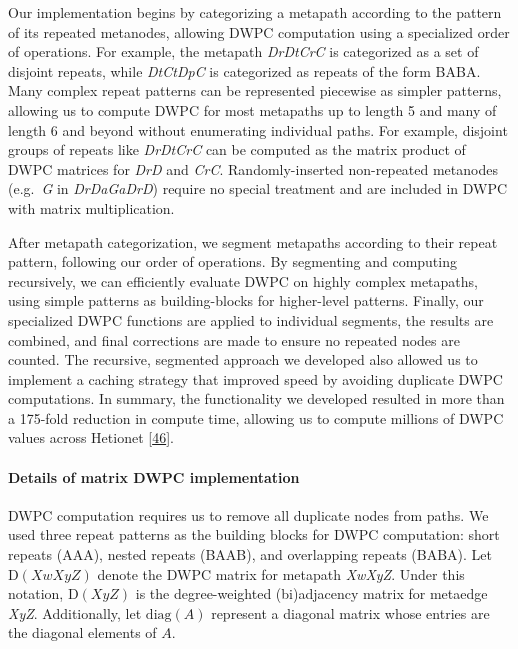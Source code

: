 Our implementation begins by categorizing a metapath according to the pattern of its repeated metanodes, allowing DWPC computation using a specialized order of operations.
For example, the metapath \emph{DrDtCrC} is categorized as a set of disjoint repeats, while \emph{DtCtDpC} is categorized as repeats of the form BABA.
Many complex repeat patterns can be represented piecewise as simpler patterns, allowing us to compute DWPC for most metapaths up to length 5 and many of length 6 and beyond without enumerating individual paths.
For example, disjoint groups of repeats like \emph{DrDtCrC} can be computed as the matrix product of DWPC matrices for \emph{DrD} and \emph{CrC}.
Randomly-inserted non-repeated metanodes (e.g.~\emph{G} in \emph{DrDaGaDrD}) require no special treatment and are included in DWPC with matrix multiplication.

After metapath categorization, we segment metapaths according to their repeat pattern, following our order of operations.
By segmenting and computing recursively, we can efficiently evaluate DWPC on highly complex metapaths, using simple patterns as building-blocks for higher-level patterns.
Finally, our specialized DWPC functions are applied to individual segments, the results are combined, and final corrections are made to ensure no repeated nodes are counted.
The recursive, segmented approach we developed also allowed us to implement a caching strategy that improved speed by avoiding duplicate DWPC computations.
In summary, the functionality we developed resulted in more than a 175-fold reduction in compute time, allowing us to compute millions of DWPC values across Hetionet {[}\protect\hyperlink{ref-15nwuvjrA}{46}{]}.

\hypertarget{details-of-matrix-dwpc-implementation}{%
\paragraph{Details of matrix DWPC implementation}\label{details-of-matrix-dwpc-implementation}}

DWPC computation requires us to remove all duplicate nodes from paths.
We used three repeat patterns as the building blocks for DWPC computation: short repeats (AAA), nested repeats (BAAB), and overlapping repeats (BABA).
Let \(\mathrm{D}(\mathit{XwXyZ})\) denote the DWPC matrix for metapath \emph{XwXyZ}.
Under this notation, \(\mathrm{D}(\mathit{XyZ})\) is the degree-weighted (bi)adjacency matrix for metaedge \emph{XyZ}.
Additionally, let \(\mathrm{diag}(A)\) represent a diagonal matrix whose entries are the diagonal elements of \(A\).

